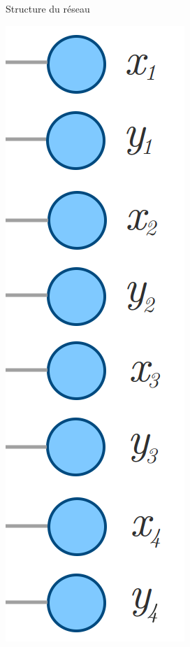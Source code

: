 \documentclass[ignorenonframetext,]{beamer}
\begin{document}
\begin{frame}{Structure du réseau}
\begin{minipage}{0.18\textwidth}
	\includegraphics[width=0.7\linewidth]{sorties.png}
	\end{minipage}
\end{frame}
\end{document}
